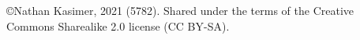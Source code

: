 \frontmatter
{}

\title{\texttitle}

\author{}

\date{}

\maketitle

\begin{minipage}[b][\textheight][b]{\textwidth}\englishfont	
	\begin{english}
		\vfill
		©Nathan Kasimer, 2021 (5782). Shared under the terms of the Creative Commons Sharealike 2.0 license (CC BY-SA).\clearpage
		
	\end{english}
\end{minipage}

